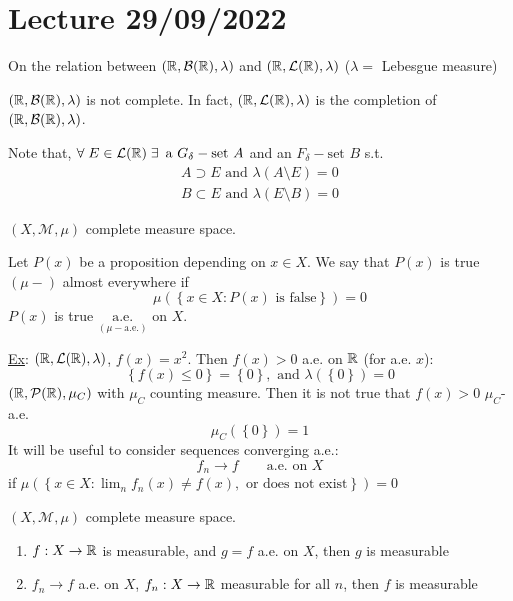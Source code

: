 \section{Lecture 29/09/2022}
\begin{remark}
    On the relation between \((\mathbb{R}, \mathcal{B}(\mathbb{R}), \lambda)\) and  \((\mathbb{R}, \mathcal{L}(\mathbb{R}), \lambda)\) \qquad (\(\lambda =\) Lebesgue measure)

    \((\mathbb{R}, \mathcal{B}(\mathbb{R}), \lambda)\) is not complete. In fact, \((\mathbb{R}, \mathcal{L}(\mathbb{R}), \lambda)\) is the completion of \((\mathbb{R}, \mathcal{B}(\mathbb{R}), \lambda)\).

    Note that, \(\forall \; E \in \mathcal{L}(\mathbb{R}) \; \exists \, \mbox{ a } G_{\delta}-\mbox{set } A\) and an \(F_{\delta}-\mbox{set } B\) s.t.
    \[
        \begin{array}{l}
            A \supset E \mbox{ and } \lambda(A \setminus E) = 0 \\
            B \subset E \mbox{ and } \lambda(E \setminus B) = 0
        \end{array}
    \]
\end{remark}
\((X, \mathcal{M}, \mu)\) complete measure space. 
\begin{definition}
    Let \(P(x)\) be a proposition depending on \(x \in X\). We say that \(P(x)\) is true \((\mu-)\) almost everywhere if 
\[
    \mu\left(\left\{ x \in X : P(x) \mbox{ is false}\right\}\right) = 0
\]
\(P(x)\) is true \(\underset{(\mu-\text{a.e.})}{\mbox{a.e.}}\) on \(X\).    
\end{definition}

\noindent\underline{Ex}: \((\mathbb{R}, \mathcal{L}(\mathbb{R}), \lambda)\), \(f(x) = x^2\).  
Then \(f(x) > 0\) a.e. on \(\mathbb{R}\) (for a.e. \(x\)):
\[
    \left\{ f(x) \leq 0 \right\} = \left\{ 0 \right\}, \mbox{ and } \lambda(\left\{ 0 \right\}) = 0
\]
\((\mathbb{R}, \mathcal{P}(\mathbb{R}), \mu_C)\) with \(\mu_C\) counting measure. Then it is not true that \(f(x) > 0\) \(\mu_C\)-a.e. 
\[
    \mu_C \left(\left\{ 0 \right\}\right) = 1
\]
It will be useful to consider sequences converging a.e.: 
\[
    f_n \to f \qquad \mbox{a.e. on }X
\]
if \(\mu\left( \left\{ x \in X : \lim_n f_n(x) \neq f(x), \mbox{ or does not exist} \right\}\right) = 0\)

\begin{proposition}
    \((X, \mathcal{M}, \mu)\) complete measure space. 
    \begin{enumerate}
        \item \(f: X \to \mathbb{R}\) is measurable, and \(g = f \) a.e. on \(X\), then \(g\) is measurable
        \item \(f_n \to f\) a.e. on \(X\), \(f_n : X \to \mathbb{R}\) measurable for all \(n\), then \(f\) is measurable
    \end{enumerate}
\end{proposition}

